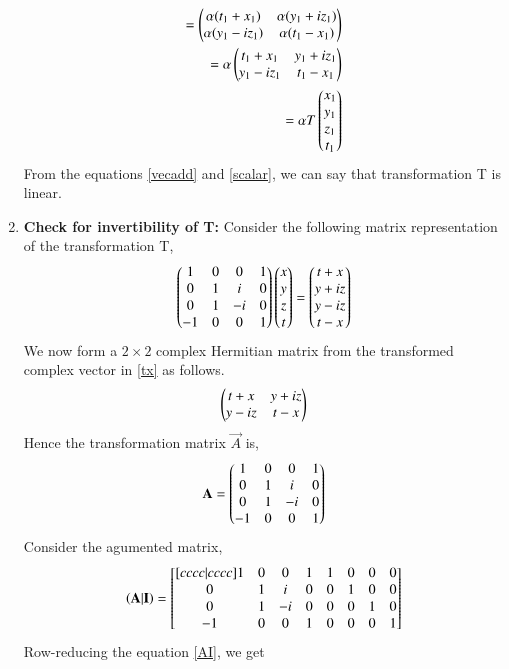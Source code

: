 \documentclass[journal,12pt,twocolumn]{IEEEtran}
\numberwithin{table}{section}
\begin{document}
\begin{enumerate}
\begin{align}
=\begin{pmatrix}\alpha(t_1+x_1)&\alpha(y_1+iz_1)\\\alpha(y_1-iz_1)&\alpha(t_1-x_1)\end{pmatrix}\\
=\alpha\begin{pmatrix}t_1+x_1&y_1+iz_1\\y_1-iz_1&t_1-x_1\end{pmatrix}\\
=\alpha T\begin{pmatrix}x_1\\y_1\\z_1\\t_1\end{pmatrix} \label{scalar}
\end{align}
From the equations \eqref{vecadd} and \eqref{scalar}, we can say that transformation T is linear.
\item \textbf{Check for invertibility of T: }
Consider the following matrix representation of the transformation T,
\begin{align}
\begin{pmatrix}1&0&0&1\\0&1&i&0\\0&1&-i&0\\-1&0&0&1\end{pmatrix}\begin{pmatrix}x\\y\\z\\t\end{pmatrix}=\begin{pmatrix}t+x\\y+iz\\y-iz\\t-x\end{pmatrix} \label{tx}
\end{align}
We now form a $2\times2$ complex Hermitian matrix from the transformed complex vector in \eqref{tx} as follows.
\begin{align}
\begin{pmatrix}t+x&y+iz\\y-iz&t-x\end{pmatrix}
\end{align}
Hence the transformation matrix $\vec{A}$ is,
\begin{align}\label{txA}
\mathbf{A}=\begin{pmatrix}1&0&0&1\\0&1&i&0\\0&1&-i&0\\-1&0&0&1\end{pmatrix}
\end{align}
Consider the agumented matrix,
\begin{equation}\label{AI}
\mathbf{\left(A|I\right)}=
  \begin{bmatrix}[cccc|cccc]
   1&0&0&1&1&0&0&0\\
   0&1&i&0&0&1&0&0\\
   0&1&-i&0&0&0&1&0\\
  -1&0&0&1&0&0&0&1\\
\end{bmatrix}
\end{equation}
Row-reducing the equation \eqref{AI}, we get
\begin{equation}\label{Ainv}

\end{equation}
\end{enumerate}
\end{document}
